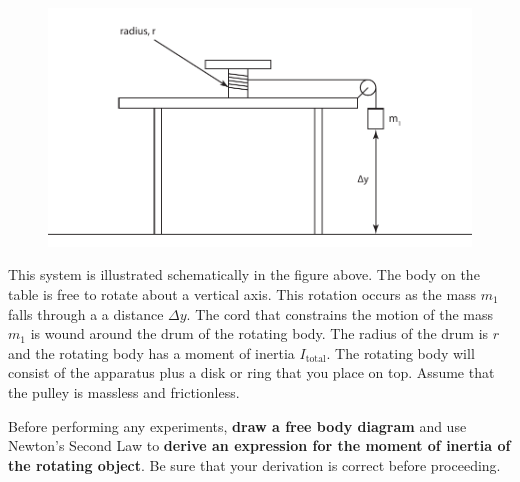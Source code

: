 \documentclass[11pt,letterpaper]{article}
\begin{document}
\begin{figure}[h]
\begin{center}
\includegraphics{./rotating_drum}
\end{center}
\label{fig:schematic}
\end{figure}

This system is illustrated schematically in the figure above.  The body on the table is free to rotate about a vertical axis. This rotation occurs as the mass $m_1$ falls through a a distance $\Delta{y}$. The cord that constrains the motion of the mass $m_1$ is wound around the drum of the rotating body. The radius of the drum is $r$ and the rotating body has a moment of inertia $I_{\mbox{total}}$. The rotating body will consist of the apparatus plus a disk or ring that you place on top. Assume that the pulley is massless and frictionless.

Before performing any experiments, \textbf{draw a free body diagram} and use Newton's Second Law to \textbf{derive an expression for the moment of inertia of the rotating object}. Be sure that your derivation is correct before proceeding.
\end{document}
